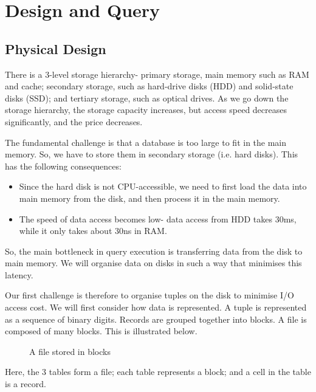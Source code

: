 \documentclass[a4paper, openany]{memoir}
\begin{document}
\chapter{Design and Query}
\section{Physical Design}
There is a 3-level storage hierarchy- primary storage, main memory such as RAM and cache; secondary storage, such as hard-drive disks (HDD) and solid-state disks (SSD); and tertiary storage, such as optical drives. As we go down the storage hierarchy, the storage capacity increases, but access speed decreases significantly, and the price decreases.

The fundamental challenge is that a database is too large to fit in the main memory. So, we have to store them in secondary storage (i.e. hard disks). This has the following consequences:
\begin{itemize}
    \item Since the hard disk is not CPU-accessible, we need to first load the data into main memory from the disk, and then process it in the main memory.
    \item The speed of data access becomes low- data access from HDD takes 30ms, while it only takes about 30ns in RAM.
\end{itemize}
So, the main bottleneck in query execution is transferring data from the disk to main memory. We will organise data on disks in such a way that minimises this latency.

Our first challenge is therefore to organise tuples on the disk to minimise I/O access cost. We will first consider how data is represented. A tuple is represented as a sequence of binary digits. Records are grouped together into blocks. A file is composed of many blocks. This is illustrated below.
\begin{figure}[H]
    \centering
    \caption{A file stored in blocks}
\end{figure}
\noindent Here, the 3 tables form a file; each table represents a block; and a cell in the table is a record.
\end{document}
